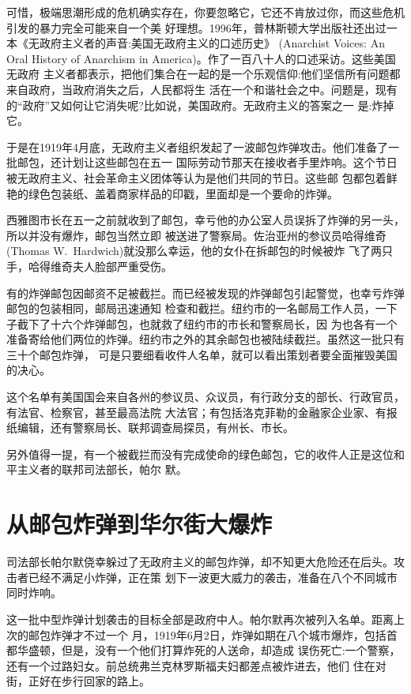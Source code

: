 \documentclass[10pt]{article}
\begin{document}
{可惜，极端思潮形成的危机确实存在，你要忽略它，它还不肯放过你，而这些危机引发的暴力完全可能来自一个美
好理想。1996年，普林斯顿大学出版社还出过一本《无政府主义者的声音:美国无政府主义的口述历史》
(Anarchist Voices: An Oral History of Anarchism in America)。作了一百八十人的口述采访。这些美国无政府
主义者都表示，把他们集合在一起的是一个乐观信仰:他们坚信所有问题都来自政府，当政府消失之后，人民都将生
活在一个和谐社会之中。问题是，现有的``政府''又如何让它消失呢?比如说，美国政府。无政府主义的答案之一
是:炸掉它。

于是在1919年4月底，无政府主义者组织发起了一波邮包炸弹攻击。他们准备了一批邮包，还计划让这些邮包在五一
国际劳动节那天在接收者手里炸响。这个节日被无政府主义、社会革命主义团体等认为是他们共同的节日。这些邮
包都包着鲜艳的绿色包装纸、盖着商家样品的印戳，里面却是一个要命的炸弹。

西雅图市长在五一之前就收到了邮包，幸亏他的办公室人员误拆了炸弹的另一头，所以并没有爆炸，邮包当然立即
被送进了警察局。佐治亚州的参议员哈得维奇(Thomas W.~Hardwich)就没那么幸运，他的女仆在拆邮包的时候被炸
飞了两只手，哈得维奇夫人脸部严重受伤。

有的炸弹邮包因邮资不足被截拦。而已经被发现的炸弹邮包引起警觉，也幸亏炸弹邮包的包装相同，邮局迅速通知
检查和截拦。纽约市的一名邮局工作人员，一下子截下了十六个炸弹邮包，也就救了纽约市的市长和警察局长，因
为也各有一个准备寄给他们两位的炸弹。纽约市之外的其余邮包也被陆续截拦。虽然这一批只有三十个邮包炸弹，
可是只要细看收件人名单，就可以看出策划者要全面摧毁美国的决心。

这个名单有美国国会来自各州的参议员、众议员，有行政分支的部长、行政官员，有法官、检察官，甚至最高法院
大法官；有包括洛克菲勒的金融家企业家、有报纸编辑，还有警察局长、联邦调查局探员，有州长、市长。

另外值得一提，有一个被截拦而没有完成使命的绿色邮包，它的收件人正是这位和平主义者的联邦司法部长，帕尔
默。

\pagebreak
\section{从邮包炸弹到华尔街大爆炸}

司法部长帕尔默侥幸躲过了无政府主义的邮包炸弹，却不知更大危险还在后头。攻击者已经不满足小炸弹，正在策
划下一波更大威力的袭击，准备在八个不同城市同时炸响。

这一批中型炸弹计划袭击的目标全部是政府中人。帕尔默再次被列入名单。距离上次的邮包炸弹才不过一个
月，1919年6月2日，炸弹如期在八个城市爆炸，包括首都华盛顿，但是，没有一个他们打算炸死的人送命，却造成
误伤死亡:一个警察，还有一个过路妇女。前总统弗兰克林\textperiodcentered 罗斯福夫妇都差点被炸进去，他们
住在对街，正好在步行回家的路上。

}
\end{document}

